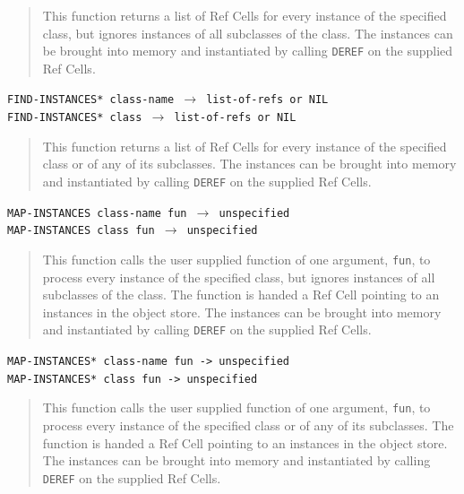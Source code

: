 \documentclass[article,oneside]{memoir}
\begin{document}
\begin{quote}
This function returns a list of Ref Cells for every instance of the specified class, but ignores instances of all subclasses of the class. The instances can be brought into memory and instantiated by calling \texttt{DEREF} on the supplied Ref Cells.
\end{quote}

\noindent \texttt{FIND-INSTANCES* class-name $\rightarrow$ list-of-refs or NIL}\\
\noindent \texttt{FIND-INSTANCES* class $\rightarrow$ list-of-refs or NIL}

\begin{quote}
This function returns a list of Ref Cells for every instance of the specified class or of any of its subclasses. The instances can be brought into memory and instantiated by calling \texttt{DEREF} on the supplied Ref Cells.
\end{quote}


\noindent \texttt{MAP-INSTANCES class-name fun $\rightarrow$ unspecified}\\
\noindent \texttt{MAP-INSTANCES class fun $\rightarrow$ unspecified}

\begin{quote}
This function calls the user supplied function of one argument, \texttt{fun}, to process every instance of the specified class, but ignores instances of all subclasses of the class. The function is handed a Ref Cell pointing to an instances in the object store. The instances can be brought into memory and instantiated by calling \texttt{DEREF} on the supplied Ref Cells.
\end{quote}


\noindent \texttt{MAP-INSTANCES* class-name fun -> unspecified}\\
\noindent \texttt{MAP-INSTANCES* class fun -> unspecified}

\begin{quote}
This function calls the user supplied function of one argument, \texttt{fun}, to process every instance of the specified class or of any of its subclasses. The function is handed a Ref Cell pointing to an instances in the object store. The instances can be brought into memory and instantiated by calling \texttt{DEREF} on the supplied Ref Cells.
\end{quote}
\end{document}
